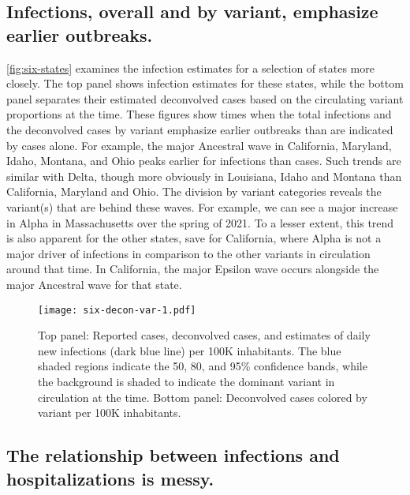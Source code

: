     
\subsection{Infections, overall and by variant, emphasize earlier outbreaks.}
\label{sec:infections-by-voc}

\autoref{fig:six-states} examines the infection estimates for a selection of
states more closely. The top panel shows infection estimates for these states,
while the bottom panel separates their estimated deconvolved cases based on the
circulating variant proportions at the time. These figures show times when the
total infections and the deconvolved cases by variant 
emphasize earlier outbreaks than are indicated by cases alone. For example,
the major Ancestral wave in California, Maryland, Idaho, Montana, and Ohio
peaks earlier for infections than cases. Such trends are similar with Delta,
though more obviously in Louisiana, Idaho and Montana than California, Maryland
and Ohio. The division by variant categories reveals the variant(s) that
are behind these waves. For example, we can see a major increase in Alpha in 
Massachusetts over the spring of 2021. To a lesser extent, this trend is also apparent
 for the other states, save for California, where Alpha is not a major driver of infections 
 in comparison to the other variants in circulation around that time. In California, 
 the major Epsilon wave occurs alongside the major Ancestral wave for that state.



\begin{figure}[!tb]
\centering
    \texttt{[image: six-decon-var-1.pdf]}
    \caption{Top panel: Reported cases, deconvolved cases, and estimates of
    daily new infections (dark blue line) per 100K inhabitants. The blue shaded
    regions indicate the 50, 80, and 95\% confidence bands, while the background
    is shaded to indicate the dominant variant in circulation at the time.  
    Bottom panel: Deconvolved cases colored by variant per 100K inhabitants.}
    \label{fig:six-states}
\end{figure}


\subsection{The relationship between infections and hospitalizations is messy.}
\label{sec:lagged-correlations}

